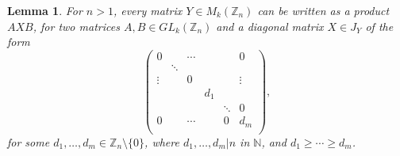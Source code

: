 \documentclass[11pt]{article}
\newtheorem{lemma}[thm]{Lemma}
\numberwithin{equation}{section}
\newcommand{\Z}{\mathbb{Z}}
\begin{document}
\begin{lemma}
  For $n > 1$, every matrix $Y \in M_k(\Z_n)$ can be written as a product $AXB$,
  for two matrices $A, B \in GL_k(\Z_n)$ and a diagonal matrix $X \in J_Y$ of
  the form
  $$\begin{pmatrix}
      0      &        & \cdots &        &        & 0       \\
             & \ddots &        &        &        &         \\
      \vdots &        & 0      &        &        & \vdots  \\
             &        &        & d_1    &        &         \\
             &        &        &        & \ddots & 0       \\
      0      &        & \cdots &        & 0      & d_m     \\
    \end{pmatrix},$$
    for some $d_1, \ldots, d_m \in \Z_n \setminus \{0\}$,
    where $d_1, \ldots, d_m | n$ in $\mathbb{N}$,
    and $d_1 \geq \cdots \geq d_m$.
\end{lemma}
\end{document}
